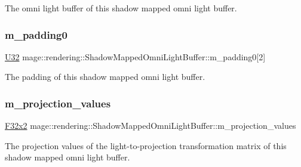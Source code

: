 The omni light buffer of this shadow mapped omni light buffer. \hypertarget{structmage_1_1rendering_1_1_shadow_mapped_omni_light_buffer_a01a76a39534ba04a2b1fe77ae5d1522c}{}\label{structmage_1_1rendering_1_1_shadow_mapped_omni_light_buffer_a01a76a39534ba04a2b1fe77ae5d1522c} 
\subsubsection{\texorpdfstring{m\+\_\+padding0}{m\_padding0}}
{\footnotesize\ttfamily \hyperlink{namespacemage_a41c104c036fba3756a74e19f793eeaa1}{U32} mage\+::rendering\+::\+Shadow\+Mapped\+Omni\+Light\+Buffer\+::m\+\_\+padding0\mbox{[}2\mbox{]}}

The padding of this shadow mapped omni light buffer. \hypertarget{structmage_1_1rendering_1_1_shadow_mapped_omni_light_buffer_a29016735134bb44c6c6f0d52fbf9ef2c}{}\label{structmage_1_1rendering_1_1_shadow_mapped_omni_light_buffer_a29016735134bb44c6c6f0d52fbf9ef2c} 
\subsubsection{\texorpdfstring{m\+\_\+projection\+\_\+values}{m\_projection\_values}}
{\footnotesize\ttfamily \hyperlink{namespacemage_aa87237ad091f5cd7da612b8523fc108f}{F32x2} mage\+::rendering\+::\+Shadow\+Mapped\+Omni\+Light\+Buffer\+::m\+\_\+projection\+\_\+values}

The projection values of the light-\/to-\/projection transformation matrix of this shadow mapped omni light buffer. \hypertarget{structmage_1_1rendering_1_1_shadow_mapped_omni_light_buffer_a6ad3f982000ca1d68c3897589aa89798}{}\label{structmage_1_1rendering_1_1_shadow_mapped_omni_light_buffer_a6ad3f982000ca1d68c3897589aa89798} 
